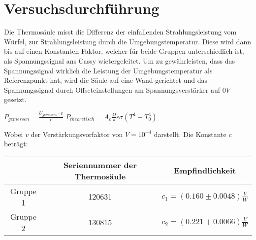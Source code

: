 \documentclass[a4paper, 11pt]{article}
\begin{document}
\section{Versuchsdurchführung}
Die Thermosäule misst die Differenz der einfallenden Strahlungsleistung vom Würfel, zur Strahlungsleistung durch die Umgebungstemperatur. Diese wird dann bis auf einen Konstanten Faktor, welcher für beide Gruppen unterschiedlich ist, als Spannungssignal ans Cassy wietergeleitet.
Um zu gewährleisten, dass das Spannungssignal wirklich die Leistung der Umgebungstemperatur als Referenzpunkt hat, wird die Säule auf eine Wand gerichtet und das Spannungssignal durch Offseteinstellungen am Spannungsverstärker auf $0V$ gesetzt. \newline
\begin{center}
$P_{gemessen}=\frac{U_{gemessen} \cdot v}{c}$
\;\;\;\;\;\;\;\;\;\;
$P_{theoretisch}=A_e \frac{\Omega}{\pi} \epsilon \sigma (T^4-T_0^4)$
\end{center}
Wobei $v$ der Verstärkungsvorfaktor von $V=10^{-4}$ darstellt. Die Konstante $c$ beträgt:
\newline
\begin{center}
\begin{tabular}{|c|c|c|}



\hline          &Seriennummer der Thermosäule & Empfindlichkeit \\
\hline Gruppe 1 & 120631 &$c_1=(0.160 \pm   0.0048)\frac{V}{W} $ \\
\hline Gruppe 2 &130815  &$c_2=(0.221 \pm   0.0066)\frac{V}{W} $     \\
\hline

\end{tabular}\newline
\end{center}
\end{document}
